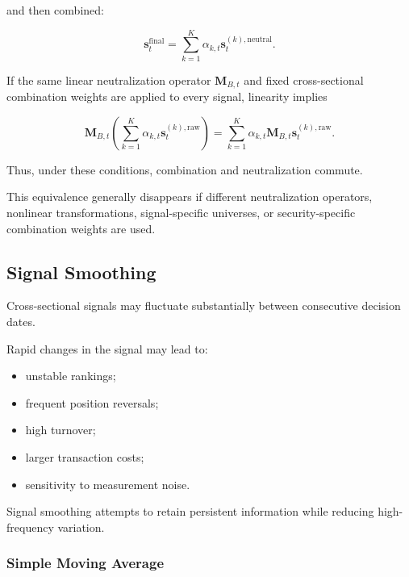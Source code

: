 \documentclass[11pt,a4paper]{article}
\begin{document}
and then combined:

\begin{equation}
\mathbf{s}_t^{\mathrm{final}}
=
\sum_{k=1}^{K}
\alpha_{k,t}
\mathbf{s}_t^{(k),\mathrm{neutral}}.
\end{equation}

If the same linear neutralization operator $\mathbf{M}_{B,t}$ and fixed
cross-sectional combination weights are applied to every signal, linearity
implies

\begin{equation}
\boxed{
\mathbf{M}_{B,t}
\left(
\sum_{k=1}^{K}
\alpha_{k,t}
\mathbf{s}_t^{(k),\mathrm{raw}}
\right)
=
\sum_{k=1}^{K}
\alpha_{k,t}
\mathbf{M}_{B,t}
\mathbf{s}_t^{(k),\mathrm{raw}}.
}
\end{equation}

Thus, under these conditions, combination and neutralization commute.

This equivalence generally disappears if different neutralization operators,
nonlinear transformations, signal-specific universes, or security-specific
combination weights are used.


\subsection{Signal Smoothing}
\label{subsec:signal_smoothing}

Cross-sectional signals may fluctuate substantially between consecutive
decision dates.

Rapid changes in the signal may lead to:

\begin{itemize}
    \item unstable rankings;
    \item frequent position reversals;
    \item high turnover;
    \item larger transaction costs;
    \item sensitivity to measurement noise.
\end{itemize}

Signal smoothing attempts to retain persistent information while reducing
high-frequency variation.


\subsubsection{Simple Moving Average}
\end{document}
